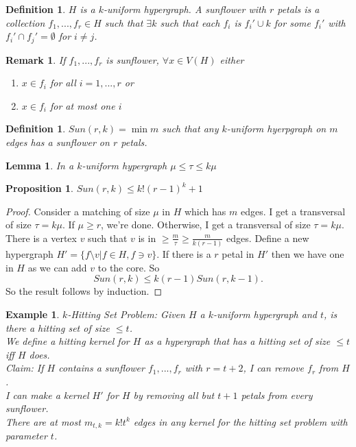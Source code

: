 \documentclass[a4paper]{article}
\newtheorem{lem}[thm]{Lemma}
\newtheorem{defn}[thm]{Definition}
\newtheorem{eg}[thm]{Example}
\newtheorem{rmk}[thm]{Remark}
\newtheorem{prop}[thm]{Proposition}
\begin{document}
\begin{defn}
    $H$ is a $k$-uniform hypergraph. A sunflower with $r$ petals is a collection $f_1,...,f_r\in H$ such that $\exists k$ such that each $f_i$ is $f_i'\cup k$ for some $f_i'$ with $f_i'\cap f_j'=\emptyset$ for $i\neq j$.
\end{defn}
\begin{rmk}
    If $f_1,...,f_r$ is sunflower, $\forall x\in V(H)$ either 
    \begin{enumerate}
        \item $x\in f_i$ for all $i=1,...,r$ or 
        \item $x\in f_i$ for at most one $i$
    \end{enumerate}
\end{rmk}
\begin{defn}
    $Sun(r,k)=\min m$ such that any $k$-uniform hyerpgraph on $m$ edges has a sunflower on $r$ petals. 
\end{defn}
\begin{lem}
    In a $k$-uniform hypergraph $\mu\leq \tau \leq k \mu$
\end{lem}
\begin{prop}
    $Sun(r,k)\leq k!(r-1)^k+1$
\end{prop}
\begin{proof}
    Consider a matching of size $\mu$ in $H$ which has $m$ edges. I get a transversal of size $\tau=k\mu$. If $\mu\geq r$, we're done. Otherwise, I get a transversal of size $\tau=k\mu$. There is a vertex $v$ such that $v$ is in $\geq \frac{m}{\tau}\geq \frac{m}{k(r-1)}$ edges. Define a new hypergraph $H'= \{f\setminus v | f\in H, f\ni v\}$. If there is a $r$ petal in $H'$ then we have one in $H$ as we can add $v$ to the core. So
    \[
    Sun(r,k)\leq k(r-1)Sun(r,k-1)
    .\] 
    So the result follows by induction.
\end{proof}
\begin{eg}
    $k$-Hitting Set Problem: Given $H$ a $k$-uniform hypergraph and $t$, is there a hitting set of size $\leq t$. \\
    We define a hitting kernel for $H$ as a hypergraph that has a hitting set of size $\leq t$ iff $H$ does. \\
    Claim: If $H$ contains a sunflower $f_1,...,f_r$ with $r=t+2$, I can remove $f_r$ from $H$. \\
    I can make a kernel $H'$ for $H$ by removing all but $t+1$ petals from every sunflower. \\
    There are at most $m_{t,k}=k! t^k$ edges in any kernel for the hitting set problem with parameter $t$. 
\end{eg}
\newpage
\end{document}
